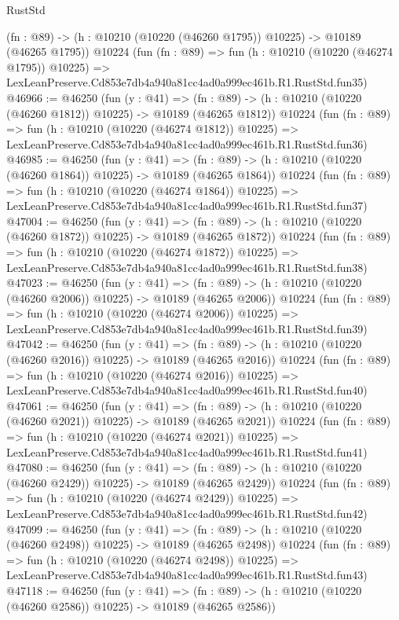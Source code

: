 \begin{lexlean}{RustStd}
\begin{coremodule}
    (fn : @89) -> (h : @10210 (@10220 (@46260 @1795)) @10225) -> @10189 (@46265 @1795))
    @10224
    (fun (fn : @89) =>
    fun (h : @10210 (@10220 (@46274 @1795)) @10225) =>
    LexLeanPreserve.Cd853e7db4a940a81cc4ad0a999ec461b.R1.RustStd.fun35)
@46966 := @46250
    (fun (y : @41) =>
    (fn : @89) -> (h : @10210 (@10220 (@46260 @1812)) @10225) -> @10189 (@46265 @1812))
    @10224
    (fun (fn : @89) =>
    fun (h : @10210 (@10220 (@46274 @1812)) @10225) =>
    LexLeanPreserve.Cd853e7db4a940a81cc4ad0a999ec461b.R1.RustStd.fun36)
@46985 := @46250
    (fun (y : @41) =>
    (fn : @89) -> (h : @10210 (@10220 (@46260 @1864)) @10225) -> @10189 (@46265 @1864))
    @10224
    (fun (fn : @89) =>
    fun (h : @10210 (@10220 (@46274 @1864)) @10225) =>
    LexLeanPreserve.Cd853e7db4a940a81cc4ad0a999ec461b.R1.RustStd.fun37)
@47004 := @46250
    (fun (y : @41) =>
    (fn : @89) -> (h : @10210 (@10220 (@46260 @1872)) @10225) -> @10189 (@46265 @1872))
    @10224
    (fun (fn : @89) =>
    fun (h : @10210 (@10220 (@46274 @1872)) @10225) =>
    LexLeanPreserve.Cd853e7db4a940a81cc4ad0a999ec461b.R1.RustStd.fun38)
@47023 := @46250
    (fun (y : @41) =>
    (fn : @89) -> (h : @10210 (@10220 (@46260 @2006)) @10225) -> @10189 (@46265 @2006))
    @10224
    (fun (fn : @89) =>
    fun (h : @10210 (@10220 (@46274 @2006)) @10225) =>
    LexLeanPreserve.Cd853e7db4a940a81cc4ad0a999ec461b.R1.RustStd.fun39)
@47042 := @46250
    (fun (y : @41) =>
    (fn : @89) -> (h : @10210 (@10220 (@46260 @2016)) @10225) -> @10189 (@46265 @2016))
    @10224
    (fun (fn : @89) =>
    fun (h : @10210 (@10220 (@46274 @2016)) @10225) =>
    LexLeanPreserve.Cd853e7db4a940a81cc4ad0a999ec461b.R1.RustStd.fun40)
@47061 := @46250
    (fun (y : @41) =>
    (fn : @89) -> (h : @10210 (@10220 (@46260 @2021)) @10225) -> @10189 (@46265 @2021))
    @10224
    (fun (fn : @89) =>
    fun (h : @10210 (@10220 (@46274 @2021)) @10225) =>
    LexLeanPreserve.Cd853e7db4a940a81cc4ad0a999ec461b.R1.RustStd.fun41)
@47080 := @46250
    (fun (y : @41) =>
    (fn : @89) -> (h : @10210 (@10220 (@46260 @2429)) @10225) -> @10189 (@46265 @2429))
    @10224
    (fun (fn : @89) =>
    fun (h : @10210 (@10220 (@46274 @2429)) @10225) =>
    LexLeanPreserve.Cd853e7db4a940a81cc4ad0a999ec461b.R1.RustStd.fun42)
@47099 := @46250
    (fun (y : @41) =>
    (fn : @89) -> (h : @10210 (@10220 (@46260 @2498)) @10225) -> @10189 (@46265 @2498))
    @10224
    (fun (fn : @89) =>
    fun (h : @10210 (@10220 (@46274 @2498)) @10225) =>
    LexLeanPreserve.Cd853e7db4a940a81cc4ad0a999ec461b.R1.RustStd.fun43)
@47118 := @46250
    (fun (y : @41) =>
    (fn : @89) -> (h : @10210 (@10220 (@46260 @2586)) @10225) -> @10189 (@46265 @2586))

\end{coremodule}
\end{lexlean}

